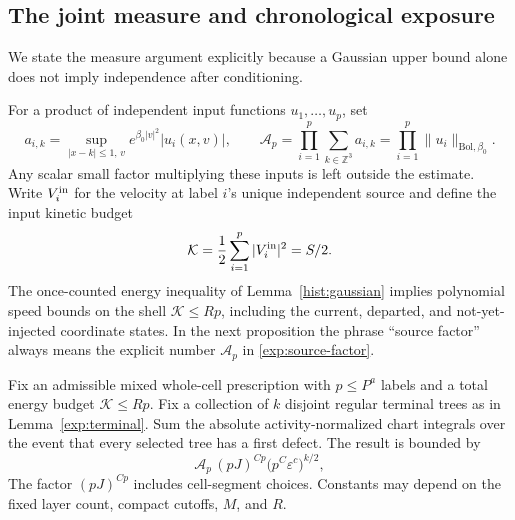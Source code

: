 \subsection{The joint measure and chronological exposure}

We state the measure argument explicitly because a Gaussian upper bound
alone does not imply independence after conditioning.

For a product of independent input functions $u_1,\ldots,u_p$, set
\begin{equation}
\label{exp:source-factor}
 a_{i,k}=\sup_{|x-k|\le1,\,v}e^{\beta_0|v|^2}|u_i(x,v)|,
 \qquad
 \mathcal A_p=\prod_{i=1}^p\sum_{k\in\mathbb Z^3}a_{i,k}
 =\prod_{i=1}^p\|u_i\|_{\mathrm{Bol},\beta_0}.
\end{equation}
Any scalar small factor multiplying these inputs is left outside the
estimate.  Write $V_i^{\rm in}$ for the velocity at label $i$'s unique
independent source and define the input kinetic budget
\[
 \mathcal K=\frac12\sum_{i=1}^p|V_i^{\rm in}|^2=S/2.
\]
The once-counted energy inequality of Lemma~\ref{hist:gaussian} implies
polynomial speed bounds on the shell $\mathcal K\le Rp$, including the
current, departed, and not-yet-injected coordinate states.  In the next
proposition the phrase ``source factor'' always means the explicit number
$\mathcal A_p$ in \eqref{exp:source-factor}.

\begin{proposition}
\label{exp:exposure}
Fix an admissible mixed whole-cell prescription with $p\le P^a$ labels and
a total energy budget $\mathcal K\le Rp$.  Fix a collection of $k$ disjoint
regular terminal trees as in Lemma~\ref{exp:terminal}.  Sum the absolute
activity-normalized chart integrals over the event that every selected tree has a
first defect.  The result is bounded by
\begin{equation}
\label{exp:exposure-bound}
 \mathcal A_p\,(pJ)^{C p}\bigl(p^C\varepsilon^c\bigr)^{k/2},
\end{equation}
The factor $(pJ)^{Cp}$ includes cell-segment choices.  Constants may
depend on the fixed layer count, compact cutoffs, $M$, and $R$.
\end{proposition}


